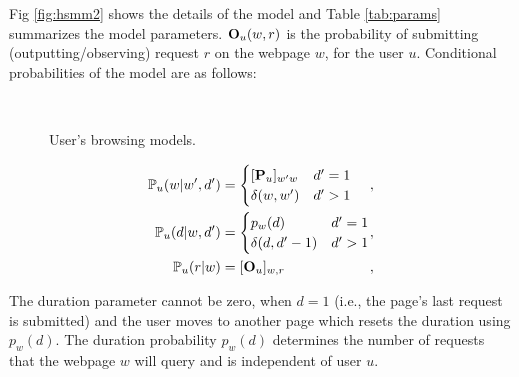 	Fig \ref{fig:hsmm2} shows the details of the model and Table \ref{tab:params} summarizes the model parameters.
	$\mathbf{O}_u(w, r)$  is the probability of submitting (outputting/observing) request $r$ on the webpage $w$, for the user $u$.	
	Conditional probabilities of the model are as follows:	
	\begin{figure}
	\centering
	~
	~
	\caption{User's browsing models.}
	\label{fig:hsmm}
\end{figure}	
	
	
	
	\begin{equation}
	\label{eq:probs}
	\begin{alignedat}{3}
	\pr_u(w | w', d') &= 
	\begin{cases} 
	[\bP_u]_{w'w} & d' = 1  \\
	\delta(w, w') & d' > 1
	\end{cases} &,&
	\\ 
	\pr_u(d | w, d') &= 
	\begin{cases} 
	p_{w}(d) & d' = 1 \\
	\delta(d, d'-1) & d' > 1
	\end{cases} &,&
	\\   
	\pr_u(r|w) &= [\O_{u}]_{w, r}&,&	
	\end{alignedat} 
	\end{equation}
	
	The duration parameter cannot be zero, when $d = 1$ (i.e., the page's last request is submitted) and the user moves to another page which resets the duration using $p_w(d)$. 
	The duration probability $p_w(d)$ determines the number of requests that the webpage $w$ will query and is independent of user $u$. 
	
